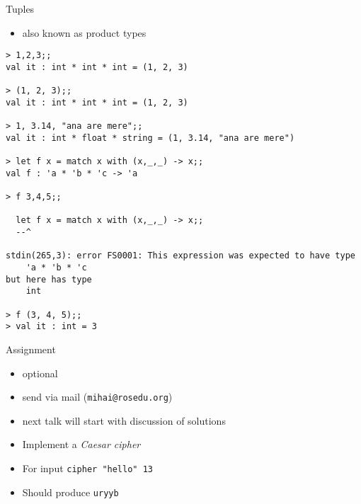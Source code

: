 \documentclass{beamer}
\begin{document}
\begin{frame}[fragile]{Tuples}
  \begin{itemize}
    \item also known as product types
  \end{itemize}
\tiny{
  \begin{verbatim}
> 1,2,3;;
val it : int * int * int = (1, 2, 3)

> (1, 2, 3);;
val it : int * int * int = (1, 2, 3)

> 1, 3.14, "ana are mere";;
val it : int * float * string = (1, 3.14, "ana are mere")

> let f x = match x with (x,_,_) -> x;;
val f : 'a * 'b * 'c -> 'a

> f 3,4,5;;

  let f x = match x with (x,_,_) -> x;;
  --^

stdin(265,3): error FS0001: This expression was expected to have type
    'a * 'b * 'c    
but here has type
    int

> f (3, 4, 5);;
> val it : int = 3
  \end{verbatim}
}
\end{frame}

\begin{frame}[fragile]{Assignment}
  \begin{itemize}
    \item optional
    \item send via mail (\texttt{mihai@rosedu.org})
    \item next talk will start with discussion of solutions
  \end{itemize}
  \pause
  \begin{itemize}
    \item Implement a \textit{Caesar cipher}
    \item For input \texttt{cipher "hello" 13}
    \item Should produce \texttt{uryyb}
  \end{itemize}
\end{frame}
\end{document}
